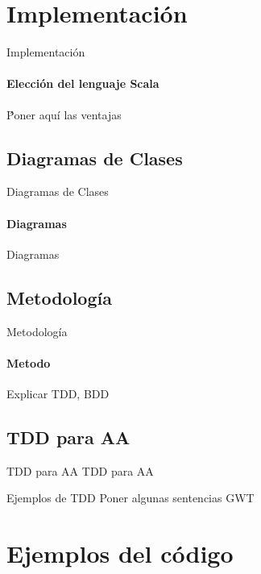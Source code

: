 \documentclass[utf8]{beamer}
\begin{document}
\section{Implementación}

\begin{frame}{Implementación}
  \framesubtitle{Elección del lenguaje Scala}
  Ṕoner aquí las ventajas
\end{frame}

\subsection{Diagramas de Clases}
\begin{frame}{Diagramas de Clases}
  \framesubtitle{Diagramas}
  Diagramas
\end{frame}

\subsection{Metodología}
\begin{frame}{Metodología}
  \framesubtitle{Metodo}
  Explicar TDD, BDD
\end{frame}

\subsection{TDD para AA}
\begin{frame}{TDD para AA}
    TDD para AA
\end{frame}

\begin{frame}{Ejemplos de TDD}
  Poner algunas sentencias GWT    
\end{frame}

\section{Ejemplos del código}
\end{document}
